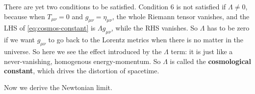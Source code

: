 \documentclass[hyperref, a4paper]{article}
\newcommand*{\concept}[1]{{\textbf{#1}}}
\begin{document}
There are yet two conditions to be satisfied. Condition 6 is not satisfied if $\Lambda \neq 0$, 
because when $T_{\mu \nu} = 0$ and $g_{\mu \nu} = \eta_{\mu \nu}$, the whole Riemann tensor 
vanishes, and the LHS of \eqref{eq:cosmos-constant} is $\Lambda g_{\mu \nu}$, while the RHS vanishes.
So $\Lambda$ has to be zero if we want $g_{\mu \nu}$ to go back to the Lorentz metrics when 
there is no matter in the universe. So here we see the effect introduced by the $\Lambda$ term: 
it is just like a never-vanishing, homogenous energy-momentum. So $\Lambda$ is called the 
\concept{cosmological constant}, which drives the distortion of spacetime. 

Now we derive the Newtonian limit. 



\end{document}
